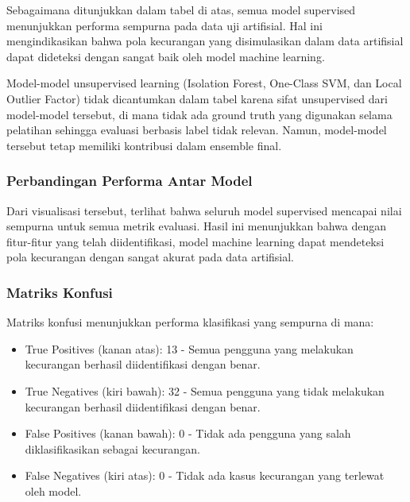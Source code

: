 Sebagaimana ditunjukkan dalam tabel di atas, semua model supervised menunjukkan performa sempurna pada data uji artifisial. Hal ini mengindikasikan bahwa pola kecurangan yang disimulasikan dalam data artifisial dapat dideteksi dengan sangat baik oleh model machine learning.

Model-model unsupervised learning (Isolation Forest, One-Class SVM, dan Local Outlier Factor) tidak dicantumkan dalam tabel karena sifat unsupervised dari model-model tersebut, di mana tidak ada ground truth yang digunakan selama pelatihan sehingga evaluasi berbasis label tidak relevan. Namun, model-model tersebut tetap memiliki kontribusi dalam ensemble final.

\subsubsection{Perbandingan Performa Antar Model}



Dari visualisasi tersebut, terlihat bahwa seluruh model supervised mencapai nilai sempurna untuk semua metrik evaluasi. Hasil ini menunjukkan bahwa dengan fitur-fitur yang telah diidentifikasi, model machine learning dapat mendeteksi pola kecurangan dengan sangat akurat pada data artifisial.

\subsubsection{Matriks Konfusi}



Matriks konfusi menunjukkan performa klasifikasi yang sempurna di mana:
\begin{itemize}
    \item True Positives (kanan atas): 13 - Semua pengguna yang melakukan kecurangan berhasil diidentifikasi dengan benar.
    \item True Negatives (kiri bawah): 32 - Semua pengguna yang tidak melakukan kecurangan berhasil diidentifikasi dengan benar.
    \item False Positives (kanan bawah): 0 - Tidak ada pengguna yang salah diklasifikasikan sebagai kecurangan.
    \item False Negatives (kiri atas): 0 - Tidak ada kasus kecurangan yang terlewat oleh model.
\end{itemize}

